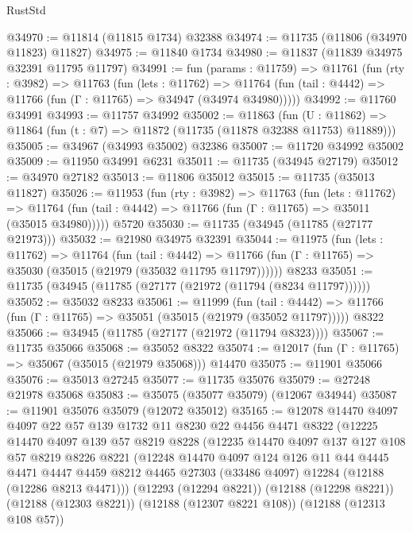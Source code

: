 \begin{lexlean}{RustStd}
\begin{coremodule}
@34970 := @11814 (@11815 @1734) @32388
@34974 := @11735 (@11806 (@34970 @11823) @11827)
@34975 := @11840 @1734
@34980 := @11837 (@11839 @34975 @32391 @11795 @11797)
@34991 := fun (params : @11759) =>
  @11761
    (fun (rty : @3982) =>
    @11763
      (fun (lets : @11762) =>
      @11764 (fun (tail : @4442) => @11766 (fun (Γ : @11765) => @34947 (@34974 @34980)))))
@34992 := @11760 @34991
@34993 := @11757 @34992
@35002 := @11863
    (fun (U : @11862) => @11864 (fun (t : @7) => @11872 (@11735 (@11878 @32388 @11753) @11889)))
@35005 := @34967 (@34993 @35002) @32386
@35007 := @11720 @34992 @35002
@35009 := @11950 @34991 @6231
@35011 := @11735 (@34945 @27179)
@35012 := @34970 @27182
@35013 := @11806 @35012
@35015 := @11735 (@35013 @11827)
@35026 := @11953
    (fun (rty : @3982) =>
    @11763
      (fun (lets : @11762) =>
      @11764 (fun (tail : @4442) => @11766 (fun (Γ : @11765) => @35011 (@35015 @34980)))))
    @5720
@35030 := @11735 (@34945 (@11785 (@27177 @21973)))
@35032 := @21980 @34975 @32391
@35044 := @11975
    (fun (lets : @11762) =>
    @11764
      (fun (tail : @4442) =>
      @11766 (fun (Γ : @11765) => @35030 (@35015 (@21979 (@35032 @11795 @11797))))))
    @8233
@35051 := @11735 (@34945 (@11785 (@27177 (@21972 (@11794 (@8234 @11797))))))
@35052 := @35032 @8233
@35061 := @11999
    (fun (tail : @4442) => @11766 (fun (Γ : @11765) => @35051 (@35015 (@21979 (@35052 @11797)))))
    @8322
@35066 := @34945 (@11785 (@27177 (@21972 (@11794 @8323))))
@35067 := @11735 @35066
@35068 := @35052 @8322
@35074 := @12017 (fun (Γ : @11765) => @35067 (@35015 (@21979 @35068))) @14470
@35075 := @11901 @35066
@35076 := @35013 @27245
@35077 := @11735 @35076
@35079 := @27248 @21978 @35068
@35083 := @35075 (@35077 @35079) (@12067 @34944)
@35087 := @11901 @35076 @35079 (@12072 @35012)
@35165 := @12078
    @14470
    @4097
    @4097
    @22
    @57
    @139
    @1732
    @11
    @8230
    @22
    @4456
    @4471
    @8322
    (@12225
      @14470
      @4097
      @139
      @57
      @8219
      @8228
      (@12235
        @14470
        @4097
        @137
        @127
        @108
        @57
        @8219
        @8226
        @8221
        (@12248
          @14470
          @4097
          @124
          @126
          @11
          @44
          @4445
          @4471
          @4447
          @4459
          @8212
          @4465
          @27303
          (@33486 @4097)
          @12284
          (@12188 (@12286 @8213 @4471)))
        (@12293 (@12294 @8221))
        (@12188 (@12298 @8221))
        (@12188 (@12303 @8221))
        (@12188 (@12307 @8221 @108))
        (@12188 (@12313 @108 @57))

\end{coremodule}
\end{lexlean}

